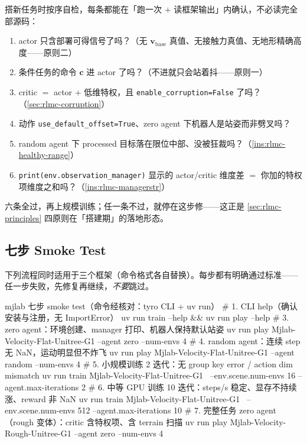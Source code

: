 \begin{insight}\label{ins:rlmc-firstwire}
搭新任务时按序自检，每条都能在「跑一次 $+$ 读框架输出」内确认，不必读完全部源码：
\begin{enumerate}
  \item actor 只含部署可得信号了吗？（无 $\mathbf v_{\text{base}}$ 真值、无接触力真值、无地形精确高度——原则二）
  \item 条件任务的命令 $\mathbf c$ 进 actor 了吗？（不进就只会站着抖——原则一）
  \item critic $=$ actor $+$ 低维特权，且 \verb|enable_corruption=False| 了吗？（\cref{sec:rlmc-corruption}）
  \item 动作 \verb|use_default_offset=True|、zero agent 下机器人是站姿而非劈叉吗？
  \item random agent 下 processed 目标落在限位中部、没被狂裁吗？（\cref{ins:rlmc-healthy-range}）
  \item \verb|print(env.observation_manager)| 显示的 actor/critic 维度差 $=$ 你加的特权项维度之和吗？（\cref{ins:rlmc-managerstr}）
\end{enumerate}
六条全过，再上规模训练；任一条不过，就停在这步修——这正是 \cref{sec:rlmc-principles} 四原则在「搭建期」的落地形态。
\end{insight}

\subsection{七步 Smoke Test}
\label{sec:rlmc-smoke}

下列流程同时适用于三个框架（命令格式各自替换）。每步都有明确通过标准——任一步失败，先修复再继续，\emph{不要}跳过。

\begin{codebox}[bash]{mjlab 七步 smoke test（命令经核对：tyro CLI + uv run）}
# 1. CLI help（确认安装与注册，无 ImportError）
uv run train --help && uv run play --help
# 3. zero agent：环境创建、manager 打印、机器人保持默认站姿
uv run play Mjlab-Velocity-Flat-Unitree-G1 --agent zero --num-envs 4
# 4. random agent：连续 step 无 NaN，运动明显但不炸飞
uv run play Mjlab-Velocity-Flat-Unitree-G1 --agent random --num-envs 4
# 5. 小规模训练 2 迭代：无 group key error / action dim mismatch
uv run train Mjlab-Velocity-Flat-Unitree-G1 \
  --env.scene.num-envs 16 --agent.max-iterations 2
# 6. 中等 GPU 训练 10 迭代：steps/s 稳定、显存不持续涨、reward 非 NaN
uv run train Mjlab-Velocity-Flat-Unitree-G1 \
  --env.scene.num-envs 512 --agent.max-iterations 10
# 7. 完整任务 zero agent（rough 变体）：critic 含特权项、含 terrain 扫描
uv run play Mjlab-Velocity-Rough-Unitree-G1 --agent zero --num-envs 4
\end{codebox}

